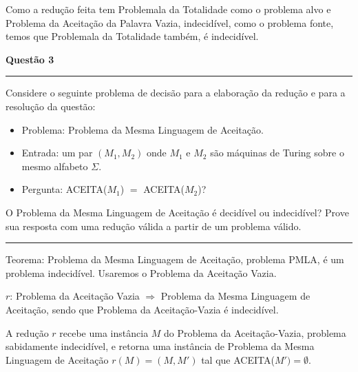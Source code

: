 \documentclass{article}
\begin{document}
\medskip

Como a redução feita tem Problemala da Totalidade como o problema alvo e Problema da Aceitação da Palavra Vazia, indecidível, como o problema fonte, temos que Problemala da Totalidade também, é indecidível.

\pagebreak

\begin{center}

    \vspace*{-11mm}
    \textbf{\large{Questão 3}}
    \vspace*{-4.8mm}

\end{center}

\noindent\rule{\textwidth}{0.5pt}

\bigskip

Considere o seguinte problema de decisão para a elaboração da redução e para a resolução da questão:

\medskip

\begin{itemize}

    \item Problema: Problema da Mesma Linguagem de Aceitação.
    \item Entrada: um par $(M_1, M_2)$ onde $M_1$ e $M_2$ são máquinas de Turing sobre o mesmo alfabeto $\Sigma$.
    \item Pergunta: ACEITA($M_1$) $=$ ACEITA($M_2$)?
    
\end{itemize}

\medskip

O Problema da Mesma Linguagem de Aceitação é decidível ou indecidível? Prove sua resposta com uma redução válida a partir de um problema válido.

\bigskip

\noindent\rule{\textwidth}{0.5pt}

\bigskip

Teorema: Problema da Mesma Linguagem de Aceitação, problema PMLA, é um problema indecidível. Usaremos o Problema da Aceitação Vazia.

\medskip

$r$: Problema da Aceitação Vazia $\Longrightarrow$ Problema da Mesma Linguagem de Aceitação, sendo que Problema da Aceitação-Vazia é indecidível.

\medskip

A redução $r$ recebe uma instância $M$ do Problema da Aceitação-Vazia, problema sabidamente indecidível, e retorna uma instância de Problema da Mesma Linguagem de Aceitação $r(M) = (M, M')$ tal que ACEITA($M') = \emptyset$.
\end{document}
